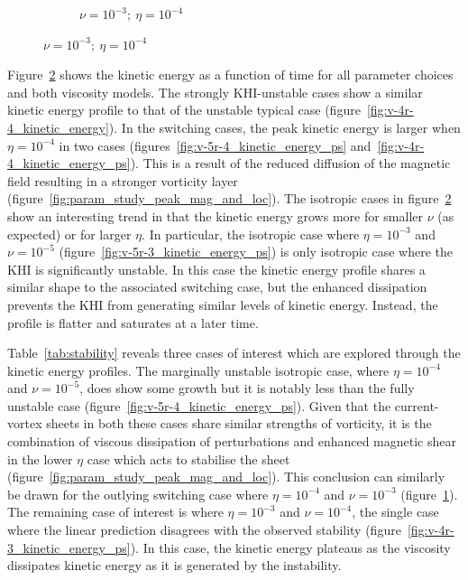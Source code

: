 \begin{figure}[t]
\begin{subfigure}{0.32\textwidth}
      \caption{$\nu = 10^{-3};\ \eta = 10^{-4}$}%
      \label{fig:v-3r-4_kinetic_energy_ps}
    \end{subfigure}
  \label{fig:param_study_kinetic_energies}
\end{figure}

Figure~\ref{fig:param_study_kinetic_energies} shows the kinetic energy as a function of time for all parameter choices and both viscosity models. The strongly KHI-unstable cases show a similar kinetic energy profile to that of the unstable typical case (figure~\ref{fig:v-4r-4_kinetic_energy}). In the switching cases, the peak kinetic energy is larger when $\eta=10^{-4}$ in two cases (figures~\ref{fig:v-5r-4_kinetic_energy_ps} and~\ref{fig:v-4r-4_kinetic_energy_ps}). This is a result of the reduced diffusion of the magnetic field resulting in a stronger vorticity layer (figure~\ref{fig:param_study_peak_mag_and_loc}). The isotropic cases in figure~\ref{fig:param_study_kinetic_energies} show an interesting trend in that the kinetic energy grows more for smaller $\nu$ (as expected) or for larger $\eta$. In particular, the isotropic case where $\eta=10^{-3}$ and $\nu=10^{-5}$ (figure~\ref{fig:v-5r-3_kinetic_energy_ps}) is only isotropic case where the KHI is significantly unstable. In this case the kinetic energy profile shares a similar shape to the associated switching case, but the enhanced dissipation prevents the KHI from generating similar levels of kinetic energy. Instead, the profile is flatter and saturates at a later time.

Table~\ref{tab:stability} reveals three cases of interest which are explored through the kinetic energy profiles. The marginally unstable isotropic case, where $\eta=10^{-4}$ and $\nu=10^{-5}$, does show some growth but it is notably less than the fully unstable case (figure~\ref{fig:v-5r-4_kinetic_energy_ps}). Given that the current-vortex sheets in both these cases share similar strengths of vorticity, it is the combination of viscous dissipation of perturbations and enhanced magnetic shear in the lower $\eta$ case which acts to stabilise the sheet (figure~\ref{fig:param_study_peak_mag_and_loc}). This conclusion can similarly be drawn for the outlying switching case where $\eta=10^{-4}$ and $\nu=10^{-3}$ (figure~\ref{fig:v-3r-4_kinetic_energy_ps}). The remaining case of interest is where $\eta=10^{-3}$ and $\nu=10^{-4}$, the single case where the linear prediction disagrees with the observed stability (figure~\ref{fig:v-4r-3_kinetic_energy_ps}). In this case, the kinetic energy plateaus as the viscosity dissipates kinetic energy as it is generated by the instability.

